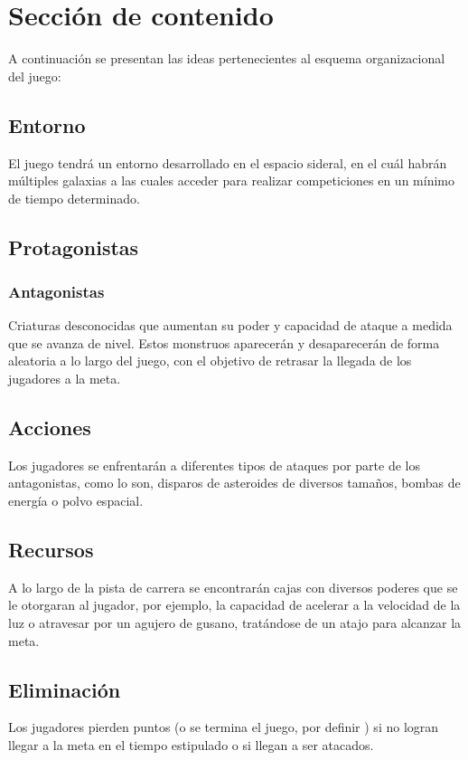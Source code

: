 \documentclass{article}
\begin{document}
\section{Sección de contenido} \label{contenido}
A continuación se presentan las ideas pertenecientes al esquema organizacional del juego:

\subsection{Entorno}
El juego tendrá un entorno desarrollado en el espacio sideral, en el cuál habrán múltiples galaxias a las cuales acceder para realizar competiciones en un mínimo de tiempo determinado.
\subsection{Protagonistas}

\subsubsection{Antagonistas}
Criaturas desconocidas que aumentan su poder y capacidad de ataque a medida que se avanza de nivel. Estos monstruos aparecerán y desaparecerán de forma aleatoria a lo largo del juego, con el objetivo de retrasar la llegada de los jugadores a la meta.

\subsection{Acciones}
Los jugadores se enfrentarán a diferentes tipos de ataques por parte de los antagonistas, como lo son, disparos de asteroides de diversos tamaños, bombas de energía o polvo espacial.

\subsection{Recursos}
A lo largo de la pista de carrera se encontrarán cajas con diversos poderes que se le otorgaran al jugador, por ejemplo, la capacidad de acelerar a la velocidad de la luz o atravesar por un agujero de gusano, tratándose de un atajo para alcanzar la meta.

\subsection{Eliminación}
Los jugadores pierden puntos (o se termina el juego, por definir ) si no logran llegar a la meta en el tiempo estipulado o si llegan a ser atacados.
\end{document}
